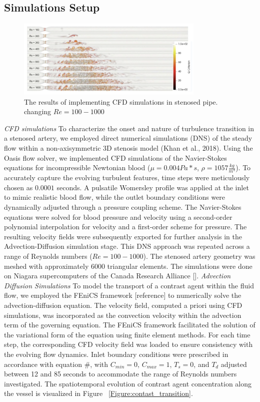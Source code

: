 \documentclass[times,twocolumn,final]{elsarticle}
\begin{document}
\subsection{Simulations Setup}
\begin{figure}[!t]
    \centering
    \includegraphics[width=0.8\textwidth]{./Figures/Figure2_results_CFD.png}
    \caption{The results of implementing CFD simulations in stenosed pipe. changing $Re=100-1000$}
    \label{fig:Results_CFD}
    
    \end{figure}
\textit{CFD simulations} To characterize the onset and nature of turbulence transition in a stenosed artery, we employed direct numerical simulations (DNS) of the steady flow within a non-axisymmetric 3D stenosis model (Khan et al., 2018). Using the Oasis flow solver, we implemented CFD simulations of the Navier-Stokes equations for incompressible Newtonian blood ($\mu = 0.004 Pa*s$, $\rho = 1057 \frac{kg}{m^{3}}$). To accurately capture the evolving turbulent features, time steps were meticulously chosen as $0.0001$ seconds. A pulsatile Womersley profile was applied at the inlet to mimic realistic blood flow, while the outlet boundary conditions were dynamically adjusted through a pressure coupling scheme. The Navier-Stokes equations were solved for blood pressure and velocity using a second-order polynomial interpolation for velocity and a first-order scheme for pressure. The resulting velocity fields were subsequently exported for further analysis in the Advection-Diffusion simulation stage. This DNS approach was repeated across a range of Reynolds numbers ($Re = 100-1000$). The stenosed artery geometry was meshed with approximately 6000 triangular elements. The simulations were done on Niagara supercomputers of the Canada Research Alliance [].
\textit{Advection Diffusion Simulations} To model the transport of a contrast agent within the fluid flow, we employed the FEniCS framework [reference] to numerically solve the advection-diffusion equation. The velocity field, computed a priori using CFD simulations, was incorporated as the convection velocity within the advection term of the governing equation. The FEniCS framework facilitated the solution of the variational form of the equation using finite element methods. For each time step, the corresponding CFD velocity field was loaded to ensure consistency with the evolving flow dynamics. Inlet boundary conditions were prescribed in accordance with equation #, with $C_{min} = 0$, $C_{max} = 1$, $T_s = 0$, and $T_d$ adjusted between 12 and 85 seconds to accommodate the range of Reynolds numbers investigated. The spatiotemporal evolution of contrast agent concentration along the vessel is visualized in Figure ~\ref{Figure:contast_transition}.
\end{document}

